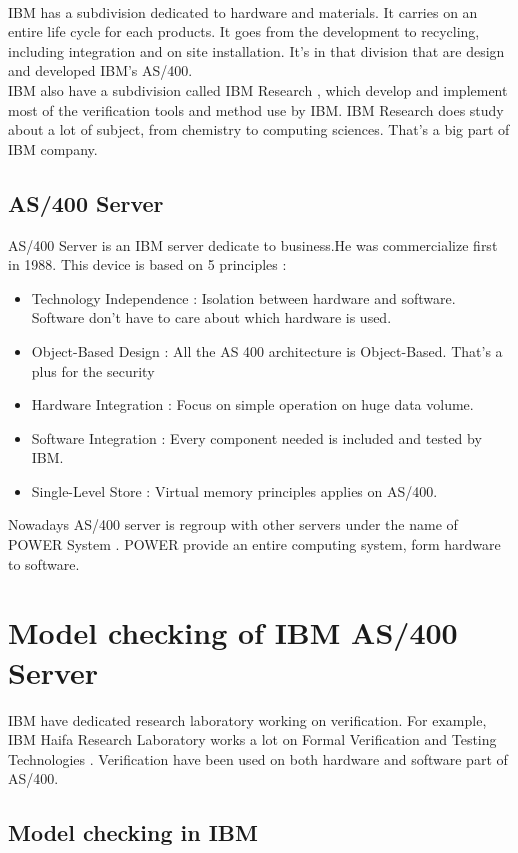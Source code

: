 \documentclass[a4paper,12pt]{article} %
\begin{document}
\paragraph{}IBM has a subdivision dedicated to hardware and materials. It carries on an entire life cycle for each products. It goes from the development to recycling, including integration and on site installation.  It's in that division that are design and developed IBM's AS/400.\\
IBM also have a subdivision called IBM Research\cite{IBMa} , which develop and implement most of the verification tools and method use by IBM. IBM Research does study about a lot of subject, from chemistry to computing sciences. That's a big part of IBM company.
\subsection{AS/400 Server}
AS/400 Server is an IBM server dedicate to business.He was commercialize first in 1988. This device is based on 5 principles : 
\begin{itemize}
 \item{Technology Independence : }Isolation between hardware and software. Software don't have to care about which hardware is used.
 \item{Object-Based Design : } All the AS 400 architecture is Object-Based. That's a plus for the security \cite{Google}
 \item{Hardware Integration : } Focus on simple operation on huge data volume.
 \item{Software Integration : } Every component needed is included and tested by IBM.
 \item{Single-Level Store : } Virtual memory principles applies on AS/400.
\end{itemize}
Nowadays AS/400 server is regroup with other servers under the name of POWER System\cite{IBMb} . POWER provide an entire computing system, form hardware to software.
\section{Model checking of IBM AS/400 Server}
IBM have dedicated research laboratory working on verification. For example, IBM Haifa Research Laboratory works a lot on Formal Verification and Testing Technologies \cite{IBMc}. Verification have been used on both hardware and software part of AS/400.
\subsection{Model checking in IBM}
\end{document}
